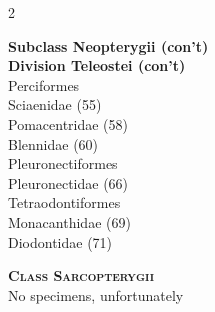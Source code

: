 \documentclass[12pt, hidelinks]{exam}
\newcommand{\onedent}{\hspace*{1em}}
\newcommand{\twodent}{\hspace*{2em}}
\begin{document}
\begin{multicols}{2}
\columnbreak

\textbf{Subclass Neopterygii (con't)}\\
\hspace*{0.67em}\textbf{Division Teleostei (con't)}\\
\onedent Perciformes\\
\twodent Sciaenidae (55)\\
\twodent Pomacentridae (58)\\
\twodent Blennidae (60)\\
\onedent Pleuronectiformes\\
\twodent Pleuronectidae (66)\\
\onedent Tetraodontiformes\\
\twodent Monacanthidae (69)\\
\twodent Diodontidae (71)

\textbf{\textsc{Class Sarcopterygii}}\\
No specimens, unfortunately

\end{multicols}
\end{document}
